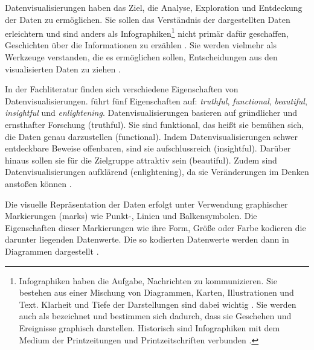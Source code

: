 Datenvisualisierungen haben das Ziel, die Analyse, Exploration und Entdeckung der Daten zu ermöglichen. Sie sollen das Verständnis der dargestellten Daten erleichtern
und sind anders als Infographiken\footnote{ Infographiken haben die Aufgabe, Nachrichten zu kommunizieren.
Sie bestehen aus einer Mischung von Diagrammen, Karten, Illustrationen und Text. Klarheit und Tiefe der Darstellungen sind dabei wichtig
\cite[vgl.][31]{cairo_truthful_2016}. Sie werden auch als 
bezeichnet und bestimmen sich dadurch, dass sie Geschehen und Ereignisse graphisch darstellen. 
Historisch sind Infographiken mit dem Medium der Printzeitungen und Printzeitschriften verbunden \cite[vgl.][27]{kirk_data_2019}.}
nicht primär dafür geschaffen, Geschichten über die Informationen zu erzählen \cite[vgl.][20 ff.]{kirk_data_2019}. 
Sie werden vielmehr als Werkzeuge verstanden, die es ermöglichen sollen, Entscheidungen aus den visualisierten Daten zu ziehen \cite[vgl.][31]{cairo_truthful_2016}. %

In der Fachliteratur finden sich verschiedene Eigenschaften von Datenvisualisierungen. 
führt fünf Eigenschaften auf: \textit{truthful}, \textit{functional}, \textit{beautiful}, \textit{insightful} und \textit{enlightening}.
Datenvisualisierungen basieren auf gründlicher und ernsthafter Forschung (truthful). Sie sind funktional, das heißt
sie bemühen sich, die Daten genau darzustellen (functional). Indem Datenvisualisierungen schwer entdeckbare Beweise offenbaren, 
sind sie aufschlussreich (insightful). Darüber hinaus sollen sie für die Zielgruppe attraktiv sein (beautiful).
Zudem sind Datenvisualisierungen aufklärend (enlightening), da sie Veränderungen im Denken anstoßen können \cite[vgl.][45]{cairo_truthful_2016}. 

Die visuelle Repräsentation der Daten erfolgt unter Verwendung graphischer Markierungen (marks) wie Punkt-, 
Linien und Balkensymbolen. Die Eigenschaften dieser Markierungen wie ihre Form, Größe oder Farbe kodieren die
darunter liegenden Datenwerte. Die so kodierten Datenwerte werden dann in Diagrammen dargestellt \cite[vgl.][135 ff.]{kirk_data_2019}.

